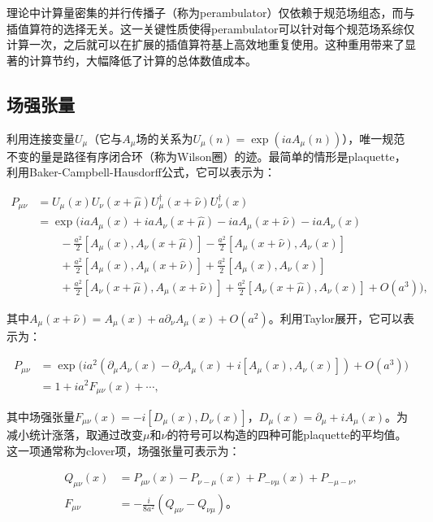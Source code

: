 \documentclass[12pt,a4paper]{ctexart}
\theoremstyle{definition}
\begin{document}
理论中计算量密集的并行传播子（称为perambulator）仅依赖于规范场组态，而与插值算符的选择无关。这一关键性质使得perambulator可以针对每个规范场系综仅计算一次，之后就可以在扩展的插值算符基上高效地重复使用。这种重用带来了显著的计算节约，大幅降低了计算的总体数值成本。

\subsection{场强张量}

利用连接变量$U_\mu$（它与$A_\mu$场的关系为$U_\mu(n) = \exp(iaA_\mu(n))$），唯一规范不变的量是路径有序闭合环（称为Wilson圈）的迹。最简单的情形是plaquette，利用Baker-Campbell-Hausdorff公式，它可以表示为：

\begin{equation}
\begin{aligned}
P_{\mu\nu} &= U_\mu(x) U_\nu(x+\hat{\mu}) U^\dagger_\mu(x+\hat{\nu}) U^\dagger_\nu(x) \\
&= \exp\Big( iaA_\mu(x) + iaA_\nu(x+\hat{\mu}) - iaA_\mu(x+\hat{\nu}) - iaA_\nu(x) \\
&\qquad -\frac{a^2}{2}[A_\mu(x), A_\nu(x+\hat{\mu})] -\frac{a^2}{2}[A_\mu(x+\hat{\nu}), A_\nu(x)] \\
&\qquad +\frac{a^2}{2}[A_\mu(x), A_\mu(x+\hat{\nu})] +\frac{a^2}{2}[A_\mu(x), A_\nu(x)] \\
&\qquad +\frac{a^2}{2}[A_\nu(x+\hat{\mu}), A_\mu(x+\hat{\nu})] +\frac{a^2}{2}[A_\nu(x+\hat{\mu}), A_\nu(x)] + O(a^3) \Big),
\end{aligned}
\label{eq:plaquette_exp}
\end{equation}

其中$A_\mu(x+\hat{\nu}) = A_\mu(x) + a\partial_\nu A_\mu(x) + O(a^2)$。利用Taylor展开，它可以表示为：

\begin{equation}
\begin{aligned}
P_{\mu\nu} &= \exp\big( ia^2(\partial_\mu A_\nu(x) - \partial_\nu A_\mu(x) + i[A_\mu(x), A_\nu(x)]) + O(a^3) \big) \\
&= 1 + ia^2 F_{\mu\nu}(x) + \cdots,
\end{aligned}
\label{eq:plaquette_expand}
\end{equation}

其中场强张量$F_{\mu\nu}(x) = -i[D_\mu(x), D_\nu(x)]$，$D_\mu(x) = \partial_\mu + iA_\mu(x)$。为减小统计涨落，取通过改变$\mu$和$\nu$的符号可以构造的四种可能plaquette的平均值。这一项通常称为clover项，场强张量可表示为：

\begin{equation}
\begin{aligned}
Q_{\mu\nu}(x) &= P_{\mu\nu}(x) - P_{\nu-\mu}(x) + P_{-\nu\mu}(x) + P_{-\mu-\nu}, \\
F_{\mu\nu} &= -\frac{i}{8a^2} (Q_{\mu\nu} - Q_{\nu\mu})。
\end{aligned}
\label{eq:clover}
\end{equation}
\end{document}
